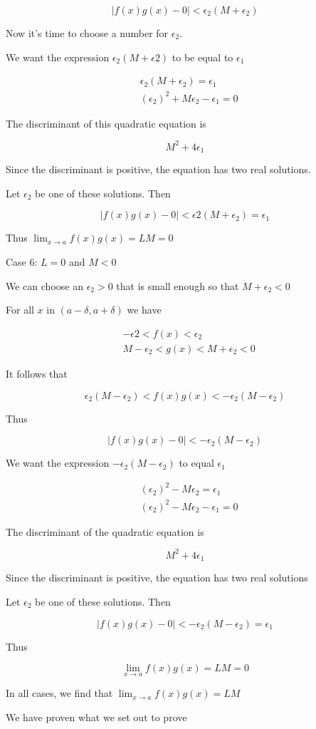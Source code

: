     $$ |f(x)g(x) - 0| < \epsilon_2(M + \epsilon_2) $$

Now it's time to choose a number for $\epsilon_2$.

We want the expression $\epsilon_2(M + \epsilon2)$ to be equal to $\epsilon_1$

\begin{align*}
& \epsilon_2(M + \epsilon_2) = \epsilon_1 \\
& (\epsilon_2)^2 + M\epsilon_2 - \epsilon_1 = 0
\end{align*}

The discriminant of this quadratic equation is

    $$ M^2 + 4\epsilon_1 $$

Since the discriminant is positive, the equation has two real solutions.

Let $\epsilon_2$ be one of these solutions. Then 

    $$ |f(x)g(x) - 0| < \epsilon2(M + \epsilon_2) = \epsilon_1 $$

Thus $\lim_{x \rightarrow a} f(x)g(x) = LM = 0 $

Case 6: $L = 0$ and $M < 0$

We can choose an $\epsilon_2 > 0$ that is small enough so that $M + \epsilon_2 < 0$

For all $x$ in $(a - \delta, a + \delta)$ we have

\begin{align*}
& -\epsilon2 < f(x) < \epsilon_2 \\
& M - \epsilon_2 < g(x) < M + \epsilon_2 < 0
\end{align*}

It follows that

    $$ \epsilon_2(M - \epsilon_2) < f(x)g(x) < -\epsilon_2(M - \epsilon_2) $$

Thus

    $$ |f(x)g(x) - 0| < -\epsilon_2(M - \epsilon_2) $$

We want the expression $-\epsilon_2(M - \epsilon_2)$ to equal $\epsilon_1$

\begin{align*}
& (\epsilon_2)^2 - M\epsilon_2 = \epsilon_1 \\
& (\epsilon_2)^2 - M\epsilon_2 - \epsilon_1 = 0
\end{align*}

The discriminant of the quadratic equation is

    $$ M^2 + 4\epsilon_1 $$

Since the discriminant is positive, the equation has two real solutions

Let $\epsilon_2$ be one of these solutions. Then

    $$ |f(x)g(x) - 0| < -\epsilon_2(M - \epsilon_2) = \epsilon_1 $$

Thus

    $$ \lim_{x \rightarrow a} f(x)g(x) = LM = 0 $$

In all cases, we find that $\lim_{x \rightarrow a} f(x)g(x) = LM$

We have proven what we set out to prove
